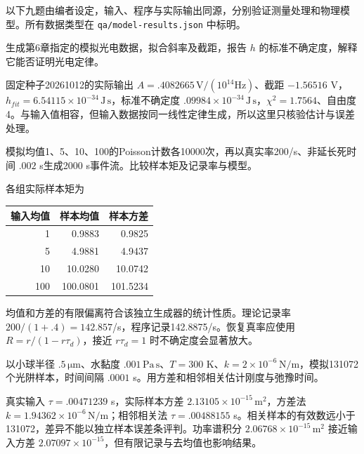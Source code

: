 以下九题由编者设定，输入、程序与实际输出同源，分别验证测量处理和物理模型。所有数据类型在 \nolinkurl{qa/model-results.json} 中标明。
\begin{exercise}
生成第6章指定的模拟光电数据，拟合斜率及截距，报告 $h$ 的标准不确定度，解释它能否证明光电定律。
\end{exercise}
\begin{solution}
固定种子20261012的实际输出 $A=.4082665\,\mathrm{V}/(10^{14}\mathrm{Hz})$、截距 $-1.56516$ V，$h_{fit}=6.54115\times10^{-34}\,\mathrm{J\,s}$，标准不确定度 $.09984\times10^{-34}\,\mathrm{J\,s}$，$\chi^2=1.7564$、自由度4。与输入值相容，但输入数据按同一线性定律生成，所以这里只核验估计与误差处理。
\end{solution}
\begin{exercise}
模拟均值1、5、10、100的Poisson计数各10000次，再以真实率200/s、非延长死时间 $.002$ s生成2000 s事件流。比较样本矩及记录率与模型。
\end{exercise}
\begin{solution}
各组实际样本矩为
\begin{center}\begin{tabular}{rrr}\toprule 输入均值&样本均值&样本方差\\\midrule
1 & 0.9883 & 0.9825\\
5 & 4.9881 & 4.9437\\
10 & 10.0280 & 10.0742\\
100 & 100.0801 & 101.5234\\
\bottomrule\end{tabular}\end{center}
均值和方差的有限偏离符合该独立生成器的统计性质。理论记录率 $200/(1+.4)=142.857$/s，程序记录142.8875/s。恢复真率应使用 $R=r/(1-r\tau_d)$，接近 $r\tau_d=1$ 时不确定度会显著放大。
\end{solution}
\begin{exercise}
以小球半径 $.5\,\mathrm{\mu m}$、水黏度 $.001\,\mathrm{Pa\,s}$、$T=300$ K、$k=2\times10^{-6}\,\mathrm{N/m}$，模拟131072个光阱样本，时间间隔 $.0001$ s。用方差和相邻相关估计刚度与弛豫时间。
\end{exercise}
\begin{solution}
真实输入 $\tau=.00471239$ s，实际样本方差 $2.13105\times10^{-15}\,\mathrm{m^2}$，方差法 $k=1.94362\times10^{-6}\,\mathrm{N/m}$；相邻相关法 $\tau=.00488155$ s。相关样本的有效数远小于131072，差异不能以独立样本误差条评判。功率谱积分 $2.06768\times10^{-15}\,\mathrm{m^2}$ 接近输入方差 $2.07097\times10^{-15}$，但有限记录与去均值也影响结果。
\end{solution}
